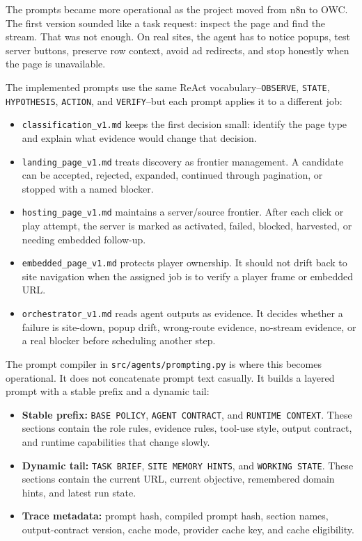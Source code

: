 The prompts became more operational as the project moved from n8n to OWC. The first
version sounded like a task request: inspect the page and find the stream. That was not
enough. On real sites, the agent has to notice popups, test server buttons, preserve row
context, avoid ad redirects, and stop honestly when the page is unavailable.

The implemented prompts use the same ReAct vocabulary--\texttt{OBSERVE}, \texttt{STATE},
\texttt{HYPOTHESIS}, \texttt{ACTION}, and \texttt{VERIFY}--but each prompt applies it to
a different job:
\begin{itemize}
  \item \texttt{classification\_v1.md} keeps the first decision small: identify the page
  type and explain what evidence would change that decision.
  \item \texttt{landing\_page\_v1.md} treats discovery as frontier management. A
  candidate can be accepted, rejected, expanded, continued through pagination, or stopped
  with a named blocker.
  \item \texttt{hosting\_page\_v1.md} maintains a server/source frontier. After each
  click or play attempt, the server is marked as activated, failed, blocked, harvested,
  or needing embedded follow-up.
  \item \texttt{embedded\_page\_v1.md} protects player ownership. It should not drift
  back to site navigation when the assigned job is to verify a player frame or embedded
  URL.
  \item \texttt{orchestrator\_v1.md} reads agent outputs as evidence. It decides whether
  a failure is site-down, popup drift, wrong-route evidence, no-stream evidence, or a
  real blocker before scheduling another step.
\end{itemize}

The prompt compiler in \texttt{src/agents/prompting.py} is where this becomes
operational. It does not concatenate prompt text casually. It builds a layered prompt
with a stable prefix and a dynamic tail:
\begin{itemize}
  \item \textbf{Stable prefix:} \texttt{BASE POLICY}, \texttt{AGENT CONTRACT}, and
  \texttt{RUNTIME CONTEXT}. These sections contain the role rules, evidence rules,
  tool-use style, output contract, and runtime capabilities that change slowly.
  \item \textbf{Dynamic tail:} \texttt{TASK BRIEF}, \texttt{SITE MEMORY HINTS}, and
  \texttt{WORKING STATE}. These sections contain the current URL, current objective,
  remembered domain hints, and latest run state.
  \item \textbf{Trace metadata:} prompt hash, compiled prompt hash, section names,
  output-contract version, cache mode, provider cache key, and cache eligibility.
\end{itemize}

